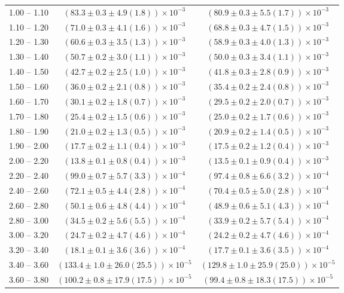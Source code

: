 \begin{table}
\begin{center}
\begin{tabular}{ c | c c }
1.00 -- 1.10 & $(83.3\pm0.3\pm4.9(1.8))\times10^{-3}$ & $(80.9\pm0.3\pm5.5(1.7))\times10^{-3}$ \\ 
1.10 -- 1.20 & $(71.0\pm0.3\pm4.1(1.6))\times10^{-3}$ & $(68.8\pm0.3\pm4.7(1.5))\times10^{-3}$ \\ 
1.20 -- 1.30 & $(60.6\pm0.3\pm3.5(1.3))\times10^{-3}$ & $(58.9\pm0.3\pm4.0(1.3))\times10^{-3}$ \\ 
1.30 -- 1.40 & $(50.7\pm0.2\pm3.0(1.1))\times10^{-3}$ & $(50.0\pm0.3\pm3.4(1.1))\times10^{-3}$ \\ 
1.40 -- 1.50 & $(42.7\pm0.2\pm2.5(1.0))\times10^{-3}$ & $(41.8\pm0.3\pm2.8(0.9))\times10^{-3}$ \\ 
1.50 -- 1.60 & $(36.0\pm0.2\pm2.1(0.8))\times10^{-3}$ & $(35.4\pm0.2\pm2.4(0.8))\times10^{-3}$ \\ 
1.60 -- 1.70 & $(30.1\pm0.2\pm1.8(0.7))\times10^{-3}$ & $(29.5\pm0.2\pm2.0(0.7))\times10^{-3}$ \\ 
1.70 -- 1.80 & $(25.4\pm0.2\pm1.5(0.6))\times10^{-3}$ & $(25.0\pm0.2\pm1.7(0.6))\times10^{-3}$ \\ 
1.80 -- 1.90 & $(21.0\pm0.2\pm1.3(0.5))\times10^{-3}$ & $(20.9\pm0.2\pm1.4(0.5))\times10^{-3}$ \\ 
1.90 -- 2.00 & $(17.7\pm0.2\pm1.1(0.4))\times10^{-3}$ & $(17.5\pm0.2\pm1.2(0.4))\times10^{-3}$ \\ 
2.00 -- 2.20 & $(13.8\pm0.1\pm0.8(0.4))\times10^{-3}$ & $(13.5\pm0.1\pm0.9(0.4))\times10^{-3}$ \\ 
2.20 -- 2.40 & $(99.0\pm0.7\pm5.7(3.3))\times10^{-4}$ & $(97.4\pm0.8\pm6.6(3.2))\times10^{-4}$ \\ 
2.40 -- 2.60 & $(72.1\pm0.5\pm4.4(2.8))\times10^{-4}$ & $(70.4\pm0.5\pm5.0(2.8))\times10^{-4}$ \\ 
2.60 -- 2.80 & $(50.1\pm0.6\pm4.8(4.4))\times10^{-4}$ & $(48.9\pm0.6\pm5.1(4.3))\times10^{-4}$ \\ 
2.80 -- 3.00 & $(34.5\pm0.2\pm5.6(5.5))\times10^{-4}$ & $(33.9\pm0.2\pm5.7(5.4))\times10^{-4}$ \\ 
3.00 -- 3.20 & $(24.7\pm0.2\pm4.7(4.6))\times10^{-4}$ & $(24.2\pm0.2\pm4.7(4.6))\times10^{-4}$ \\ 
3.20 -- 3.40 & $(18.1\pm0.1\pm3.6(3.6))\times10^{-4}$ & $(17.7\pm0.1\pm3.6(3.5))\times10^{-4}$ \\ 
3.40 -- 3.60 & $(133.4\pm1.0\pm26.0(25.5))\times10^{-5}$ & $(129.8\pm1.0\pm25.9(25.0))\times10^{-5}$ \\ 
3.60 -- 3.80 & $(100.2\pm0.8\pm17.9(17.5))\times10^{-5}$ & $(99.4\pm0.8\pm18.3(17.5))\times10^{-5}$ \\ 

\end{tabular}
\end{center}
\end{table}
